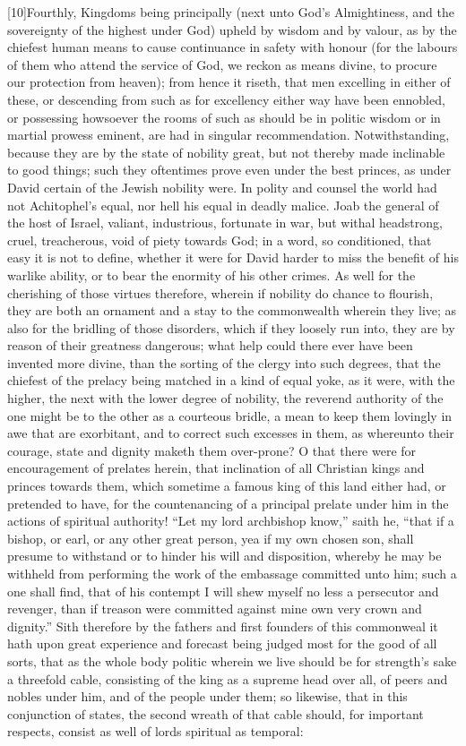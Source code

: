 [10]Fourthly, Kingdoms being principally (next unto God’s Almightiness, and the sovereignty of the highest under God) upheld by wisdom and by valour, as by the chiefest human means to cause continuance in safety with honour (for the labours of them who attend the service of God, we reckon as means divine, to procure our protection from heaven); from hence it riseth, that men excelling in either of these, or descending from such as for excellency either way have been ennobled, or possessing howsoever the rooms of such as should be in politic wisdom or in martial prowess eminent, are had in singular recommendation. Notwithstanding, because they are by the state of nobility great, but not thereby made inclinable to good things; such they oftentimes prove even under the best princes, as under David certain of the Jewish nobility were. In polity and counsel the world had not Achitophel’s equal, nor hell his equal in deadly malice. Joab the general of the host of Israel, valiant, industrious, fortunate in war, but withal headstrong, cruel, treacherous, void of piety towards God; in a word, so conditioned, that easy it is not to define, whether it were for David harder to miss the benefit of his warlike ability, or to bear the enormity of his other crimes. As well for the cherishing of those virtues therefore, wherein if nobility do chance to flourish, they are both an ornament and a stay to the commonwealth wherein they live; as also for the bridling of those disorders, which if they loosely run into, they are by reason of their greatness dangerous; what help could there ever have been invented more divine, than the sorting of the clergy into such degrees, that the chiefest of the prelacy being matched in a kind of equal yoke, as it were, with the higher, the next with the lower degree of nobility, the reverend authority of the one might be to the other as a courteous bridle, a mean to keep them lovingly in awe that are exorbitant, and to correct such excesses in them, as whereunto their courage, state and dignity maketh them over-prone? O that there were for encouragement of prelates herein, that  inclination of all Christian kings and princes towards them, which sometime a famous king of this land either had, or pretended to have, for the countenancing of a principal prelate under him in the actions of spiritual authority! “Let my lord archbishop know,” saith he, “that if a bishop, or earl, or any other great person, yea if my own chosen son, shall presume to withstand or to hinder his will and disposition, whereby he may be withheld from performing the work of the embassage committed unto him; such a one shall find, that of his contempt I will shew myself no less a persecutor and revenger, than if treason were committed against mine own very crown and dignity.” Sith therefore by the fathers and first founders of this commonweal it hath upon great experience and forecast being judged most for the good of all sorts, that as the whole body politic wherein we live should be for strength’s sake a threefold cable, consisting of the king as a supreme head over all, of peers and nobles under him, and of the people under them; so likewise, that in this conjunction of states, the second wreath of that cable should, for important respects, consist as well of lords spiritual as temporal: 